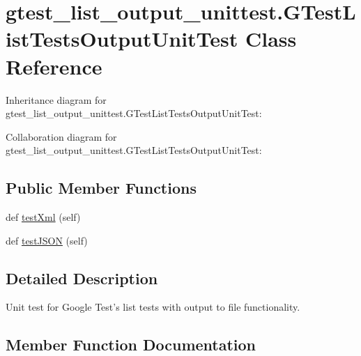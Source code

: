 \hypertarget{classgtest__list__output__unittest_1_1GTestListTestsOutputUnitTest}{}\section{gtest\+\_\+list\+\_\+output\+\_\+unittest.\+G\+Test\+List\+Tests\+Output\+Unit\+Test Class Reference}
\label{classgtest__list__output__unittest_1_1GTestListTestsOutputUnitTest}


Inheritance diagram for gtest\+\_\+list\+\_\+output\+\_\+unittest.\+G\+Test\+List\+Tests\+Output\+Unit\+Test\+:


Collaboration diagram for gtest\+\_\+list\+\_\+output\+\_\+unittest.\+G\+Test\+List\+Tests\+Output\+Unit\+Test\+:
\subsection*{Public Member Functions}
\begin{DoxyCompactItemize}
\item 
def \hyperlink{classgtest__list__output__unittest_1_1GTestListTestsOutputUnitTest_ad3088bc8ee3a0abdabbf1b90507e272e}{test\+Xml} (self)
\item 
def \hyperlink{classgtest__list__output__unittest_1_1GTestListTestsOutputUnitTest_a99bc0627a969b4c7b63ed91e8f187637}{test\+J\+S\+ON} (self)
\end{DoxyCompactItemize}


\subsection{Detailed Description}
\begin{DoxyVerb}Unit test for Google Test's list tests with output to file functionality.
\end{DoxyVerb}
 

\subsection{Member Function Documentation}
\mbox{\label{classgtest__list__output__unittest_1_1GTestListTestsOutputUnitTest_a99bc0627a969b4c7b63ed91e8f187637}} 
